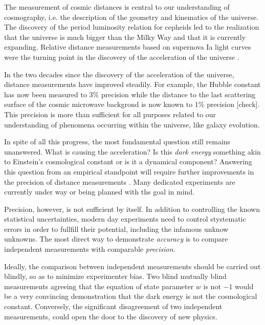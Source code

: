 The measurement of cosmic distances is central to our understanding of
cosmography, i.e. the description of the geometry and kinematics of
the universe. The discovery of the period luminosity relation for
cepheids led to the realization that the universe is much bigger than
the Milky Way and that it is currently expanding. Relative distance
measurements based on supernova Ia light curves were the turning point
in the discovery of the acceleration of the universe
\cite{Riess:1998p21184,Per++99}.

In the two decades since the discovery of the acceleration of the
universe, distance measurements have improved steadily. For example,
the Hubble constant has now been measured to 3\% precision
\cite{Rie++11,Fre++12} 
while the distance to the last scattering surface of the cosmic
microwave backgrond is now known to 1\% precision [check]. This
precision is more than sufficient for all purposes related to our
understanding of phenomena occurring within the universe, like galaxy
evolution.

In spite of all this progress, the most fundamental question still
remains unanswered. What is causing the acceleration? Is this {\it
dark energy} something akin to Einstein's cosmological constant or is
it a dynamical component? Answering this question from an empirical
standpoint will require further improvements in the precision of
distance measurements \cite{Wei++13}.  Many dedicated experiments are
currently under way or being planned with ths goal in mind.

Precision, however, is not sufficient by itself. In addition to
controlling the known statistical uncertainties, modern day
experiments need to control stystematic errors in order to fullfill
their potential, including the infamous unknow unknowns. The most
direct way to demonstrate {\it accuracy} is to compare independent
measurements with comparable {\it precision}.

Ideally, the comparison between independent measurements should be
carried out blindly, so as to minimize experimenter bias. Two blind
mutually blind measurements agreeing that the equation of state
parameter $w$ is not $-1$ would be a very convincing demonstration
that the dark energy is not the cosmological constant. Conversely, the
significant disagreement of two independent measurements, could open
the door to the discovery of new physics.

